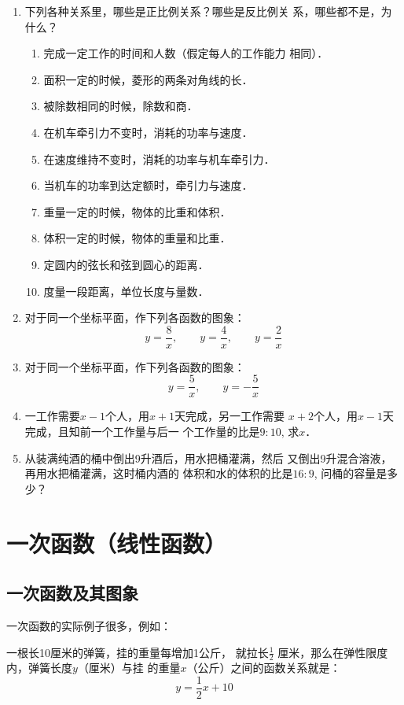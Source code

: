 \begin{ex}
\begin{enumerate}
    \item 下列各种关系里，哪些是正比例关系？哪些是反比例关
    系，哪些都不是，为什么？
    \begin{enumerate}
    \item 完成一定工作的时间和人数（假定每人的工作能力
    相同）．
    \item 面积一定的时候，菱形的两条对角线的长．
    \item 被除数相同的时候，除数和商．
    \item 在机车牵引力不变时，消耗的功率与速度．
    \item 在速度维持不变时，消耗的功率与机车牵引力．
    \item 当机车的功率到达定额时，牵引力与速度．
    \item 重量一定的时候，物体的比重和体积．
    \item 体积一定的时候，物体的重量和比重．
    \item 定圆内的弦长和弦到圆心的距离．
    \item 度量一段距离，单位长度与量数．        
    \end{enumerate}

    \item 对于同一个坐标平面，作下列各函数的图象：
    \[y=\frac{8}{x},\qquad y=\frac{4}{x},\qquad y=\frac{2}{x}\]
    \item  对于同一个坐标平面，作下列各函数的图象：
    \[y=\frac{5}{x},\qquad y=-\frac{5}{x}\]
    \item 一工作需要$x-1$个人，用$x+1$天完成，另一工作需要
    $x+2$个人，用$x-1$天完成，且知前一个工作量与后一
    个工作量的比是$9:10$, 求$x$．
\item 从装满纯酒的桶中倒出9升酒后，用水把桶灌满，然后
又倒出9升混合溶液，再用水把桶灌满，这时桶内酒的
体积和水的体积的比是$16:9$, 问桶的容量是多少？
\end{enumerate}
\end{ex}

\section{一次函数（线性函数）}
\subsection{一次函数及其图象}
一次函数的实际例子很多，例如：


\begin{example}
一根长10厘米的弹簧，挂的重量每增加1公斤，
就拉长$\frac{1}{2}$
厘米，那么在弹性限度内，弹簧长度$y$（厘米）与挂
的重量$x$（公斤）之间的函数关系就是：
\begin{equation}
    y=\frac{1}{2}x+10
\end{equation}
\end{example}



